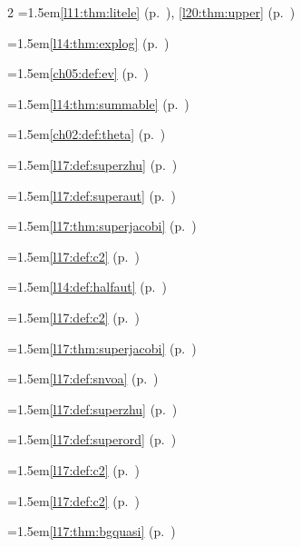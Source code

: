 \begin{multicols}{2}
\hangindent=1.5em\quad \ref{l11:thm:litele} (p.~\pageref{l11:thm:litele}), \ref{l20:thm:upper} (p.~\pageref{l20:thm:upper})\par
\hangindent=1.5em\quad \ref{l14:thm:explog} (p.~\pageref{l14:thm:explog})\par
\hangindent=1.5em\quad \ref{ch05:def:ev} (p.~\pageref{ch05:def:ev})\par
\hangindent=1.5em\quad \ref{l14:thm:summable} (p.~\pageref{l14:thm:summable})\par
\hangindent=1.5em\quad \ref{ch02:def:theta} (p.~\pageref{ch02:def:theta})\par
\hangindent=1.5em\quad \ref{l17:def:superzhu} (p.~\pageref{l17:def:superzhu})\par
\hangindent=1.5em\quad \ref{l17:def:superaut} (p.~\pageref{l17:def:superaut})\par
\hangindent=1.5em\quad \ref{l17:thm:superjacobi} (p.~\pageref{l17:thm:superjacobi})\par
\hangindent=1.5em\quad \ref{l17:def:c2} (p.~\pageref{l17:def:c2})\par
\hangindent=1.5em\quad \ref{l14:def:halfaut} (p.~\pageref{l14:def:halfaut})\par
\hangindent=1.5em\quad \ref{l17:def:c2} (p.~\pageref{l17:def:c2})\par
\hangindent=1.5em\quad \ref{l17:thm:superjacobi} (p.~\pageref{l17:thm:superjacobi})\par
\hangindent=1.5em\quad \ref{l17:def:snvoa} (p.~\pageref{l17:def:snvoa})\par
\hangindent=1.5em\quad \ref{l17:def:superzhu} (p.~\pageref{l17:def:superzhu})\par
\hangindent=1.5em\quad \ref{l17:def:superord} (p.~\pageref{l17:def:superord})\par
\hangindent=1.5em\quad \ref{l17:def:c2} (p.~\pageref{l17:def:c2})\par
\hangindent=1.5em\quad \ref{l17:def:c2} (p.~\pageref{l17:def:c2})\par
\hangindent=1.5em\quad \ref{l17:thm:bgquasi} (p.~\pageref{l17:thm:bgquasi})\par

\end{multicols}
